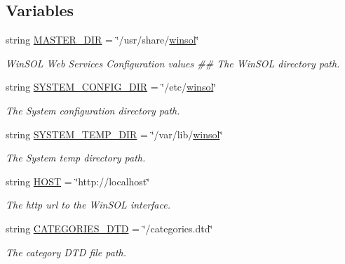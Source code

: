 \subsection*{Variables}
\begin{CompactItemize}
\item 
string \hyperlink{namespaceweb__winsol_575870dfef202cb94a079c4eb1280e6d}{MASTER\_\-DIR} = \char`\"{}/usr/share/\hyperlink{namespacewinsol_624e4bca2810b741068d3494a5a7612d}{winsol}\char`\"{}
\begin{CompactList}\small\item\em Win\-SOL Web Services Configuration values \#\# The Win\-SOL directory path. \item\end{CompactList}\item 
string \hyperlink{namespaceweb__winsol_fa7518c129e68076c6b80e16cc1d34d6}{SYSTEM\_\-CONFIG\_\-DIR} = \char`\"{}/etc/\hyperlink{namespacewinsol_624e4bca2810b741068d3494a5a7612d}{winsol}\char`\"{}
\begin{CompactList}\small\item\em The System configuration directory path. \item\end{CompactList}\item 
string \hyperlink{namespaceweb__winsol_67e3ee663ec1eec231eb892309c5fd07}{SYSTEM\_\-TEMP\_\-DIR} = \char`\"{}/var/lib/\hyperlink{namespacewinsol_624e4bca2810b741068d3494a5a7612d}{winsol}\char`\"{}
\begin{CompactList}\small\item\em The System temp directory path. \item\end{CompactList}\item 
string \hyperlink{namespaceweb__winsol_c41d276ce6f34b7facca207a47d859bd}{HOST} = \char`\"{}http://localhost\char`\"{}
\begin{CompactList}\small\item\em The http url to the Win\-SOL interface. \item\end{CompactList}\item 
string \hyperlink{namespaceweb__winsol_2eb695d5ff57aa0a09995d8622b60efd}{CATEGORIES\_\-DTD} = \char`\"{}/categories.dtd\char`\"{}
\begin{CompactList}\small\item\em The category DTD file path. \item\end{CompactList}\item 

\end{CompactItemize}
